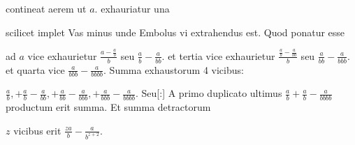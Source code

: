 \protect{} contineat aerem\protect{} ut  $\displaystyle a$.
exhauriatur una\rule[0mm]{0mm}{5mm}
scilicet implet Vas minus unde Embolus vi extrahendus est.
Quod ponatur esse \rule[-4mm]{0mm}{6mm}ad $\displaystyle a$
vice exhaurietur $\displaystyle\frac{a-\displaystyle\frac{a}{b}}{b}$ seu $\displaystyle\frac{a}{b}-\frac{a}{bb}.$
et tertia vice exhaurietur $\displaystyle\frac{\displaystyle\frac{a}{b}-\frac{a}{bb}}{b}$
seu $\displaystyle \frac{a}{bb}-\frac{a}{bbb}.$
et quarta vice $\displaystyle \frac{a}{bbb}-\frac{a}{bbbb}.$
Summa exhaustorum 4 vicibus:\rule[-4mm]{0mm}{10mm}
$\displaystyle \frac{a}{b},+\frac{a}{b}-\frac{a}{bb},+\frac{a}{bb}-\frac{a}{bbb},+\frac{a}{bbb}-\frac{a}{bbbb}.$%
\pend%
\pstart%
\vspace*{1.0em}%
\normalsize%
\centering%
Seu[:]%
\pend%
\pstart%
\vspace*{1.0em}%
\normalsize%
\noindent%
A primo duplicato ultimus 
$\displaystyle \frac{a}{b}+\frac{a}{b}-\frac{a}{bbbb}$
productum erit summa.
Et summa detractorum \rule[-4mm]{0mm}{10mm}$\displaystyle z$ vicibus erit $\displaystyle\frac{za}{b}-\frac{a}{b^{z+2}}.$%
\pend%
\newpage
\count{}
\count{}
\count{}
\pstart%
\normalsize%
\noindent%
